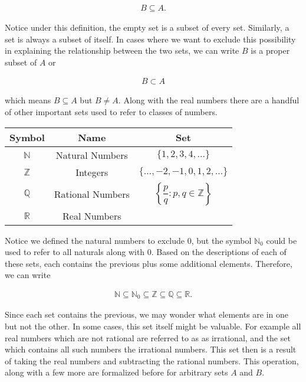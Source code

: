\documentclass[twoside]{report}
\begin{document}
\begin{align*}
	B \subseteq A.
\end{align*}

Notice under this definition, the empty set is a subset of every set. Similarly, a set is always a subset of itself. In cases where we want to exclude this possibility in explaining the relationship between the two sets, we can write $B$ is a proper subset of $A$ or 

\begin{align*}
	B \subset A
\end{align*}

which means $B \subseteq A$ but $B \neq A$. Along with the real numbers there are a handful of other important sets used to refer to classes of numbers.

\vspace{\baselineskip}
\begin{center}
	\begin{tabular}{ccc}
		\toprule
		Symbol & Name & Set \\
		\midrule
		$\mathbb{N}$ & Natural Numbers & $\{1, 2, 3, 4, \dots\}$ \\[10pt]
		$\mathbb{Z}$ & Integers & $\{\dots, -2, -1, 0, 1, 2, \dots\}$ \\[10pt]
		$\mathbb{Q}$ & Rational Numbers & $\left\{ \dfrac{p}{q} : p,q \in \mathbb{Z}\right\}$ \\[10pt]
		$\mathbb{R}$ & Real Numbers & \\
		\bottomrule
	\end{tabular}
\end{center}
\vspace{\baselineskip}

Notice we defined the natural numbers to exclude 0, but the symbol $\mathbb{N}_0$ could be used to refer to all naturals along with 0. Based on the descriptions of each of these sets, each contains the previous plus some additional elements. Therefore, we can write

\begin{align}
	\mathbb{N} \subseteq \mathbb{N}_0 \subseteq \mathbb{Z} \subseteq \mathbb{Q} \subseteq \mathbb{R}.
\end{align}

Since each set contains the previous, we may wonder what elements are in one but not the other. In some cases, this set itself might be valuable. For example all real numbers which are not rational are  referred to as as irrational, and the set which contains all such numbers the irrational numbers. This set then is a result of taking the real numbers and subtracting the rational numbers. This operation, along with a few more are formalized before for arbitrary sets $A$ and $B$.
\end{document}
